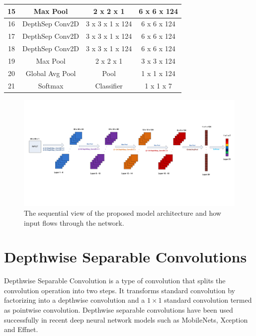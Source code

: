 \documentclass[master]{thesis-uestc}
\begin{document}
\begin{table}[ht]
\begin{center}
\begin{tabular}{|c|c|c|c|}
15 & Max Pool & 2 x 2 x 1 & 6 x 6 x 124\\ \hline

16 & DepthSep Conv2D & 3 x 3 x 1 x 124 & 6 x 6 x 124\\ \hline
17 & DepthSep Conv2D & 3 x 3 x 1 x 124 & 6 x 6 x 124\\ \hline
18 & DepthSep Conv2D & 3 x 3 x 1 x 124 & 6 x 6 x 124\\ \hline

19 & Max Pool & 2 x 2 x 1 & 3 x 3 x 124\\ \hline

20 & Global Avg Pool & Pool & 1 x 1 x 124\\ \hline
21 & Softmax & Classifier & 1 x 1 x 7\\ \hline

\end{tabular}
\end{center}
\end{table}

\begin{figure}[ht]
\includegraphics[width=6in]{pic/sequence_model_architecture.pdf}
\caption{The sequential view of the proposed model architecture and how input flows through the network.}
\label{sequence_model_arch}
\end{figure}

\section{Depthwise Separable Convolutions}\label{depthconve}
Depthwise Separable Convolution is a type of convolution that splits the convolution operation into two steps. It transforms standard convolution by factorizing into a depthwise convolution and a $1 \times 1$ standard convolution termed as pointwise convolution. Depthwise separable convolutions have been used successfully in recent deep neural network models such as MobileNets\cite{DBLP:journals/corr/HowardZCKWWAA17}, Xception\cite{DBLP:journals/corr/Chollet16a} and Effnet\cite{8451339}.
\end{document}

